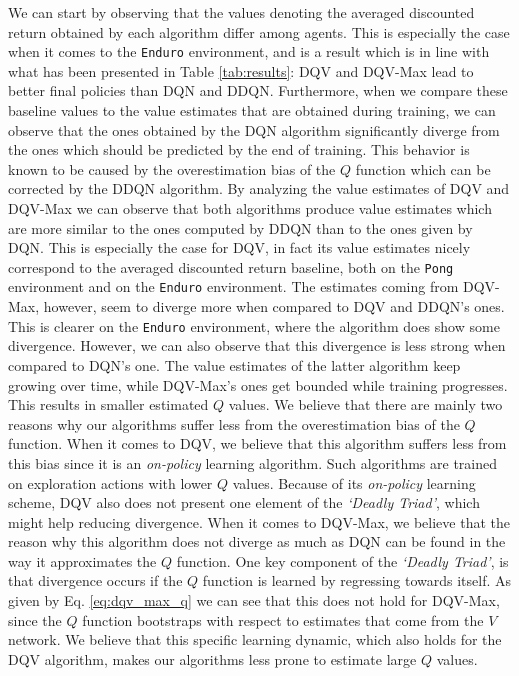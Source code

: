 We can start by observing that the values denoting the averaged discounted return obtained by each algorithm differ among agents. This is especially the case when it comes to the \texttt{Enduro} environment, and is a result which is in line with what has been presented in Table \ref{tab:results}: DQV and DQV-Max lead to better final policies than DQN and DDQN. Furthermore, when we compare these baseline values to the value estimates that are obtained during training, we can observe that the ones obtained by the DQN algorithm significantly diverge from the ones which should be predicted by the end of training. This behavior is known to be caused by the overestimation bias of the $Q$ function which can be corrected by the DDQN algorithm. By analyzing the value estimates of DQV and DQV-Max we can observe that both algorithms produce value estimates which are more similar to the ones computed by DDQN than to the ones given by DQN. This is especially the case for DQV, in fact its value estimates nicely correspond to the averaged discounted return baseline, both on the \texttt{Pong} environment and on the \texttt{Enduro} environment. The estimates coming from DQV-Max, however, seem to diverge more when compared to DQV and DDQN's ones. This is clearer on the \texttt{Enduro} environment, where the algorithm does show some divergence. However, we can also observe that this divergence is less strong when compared to DQN's one. The value estimates of the latter algorithm keep growing over time, while DQV-Max's ones get bounded while training progresses. This results in smaller estimated $Q$ values. We believe that there are mainly two reasons why our algorithms suffer less from the overestimation bias of the $Q$ function. When it comes to DQV, we believe that this algorithm suffers less from this bias since it is an \textit{on-policy} learning algorithm. Such algorithms are trained on exploration actions with lower $Q$ values. Because of its \textit{on-policy} learning scheme, DQV also does not present one element of the \textit{`Deadly Triad'}, which might help reducing divergence. When it comes to DQV-Max, we believe that the reason why this algorithm does not diverge as much as DQN can be found in the way it approximates the $Q$ function. One key component of the \textit{`Deadly Triad'}, is that divergence occurs if the $Q$ function is learned by regressing towards itself. As given by Eq. \ref{eq:dqv_max_q} we can see that this does not hold for DQV-Max, since the $Q$ function bootstraps with respect to estimates that come from the $V$ network. We believe that this specific learning dynamic, which also holds for the DQV algorithm, makes our algorithms less prone to estimate large $Q$ values.

